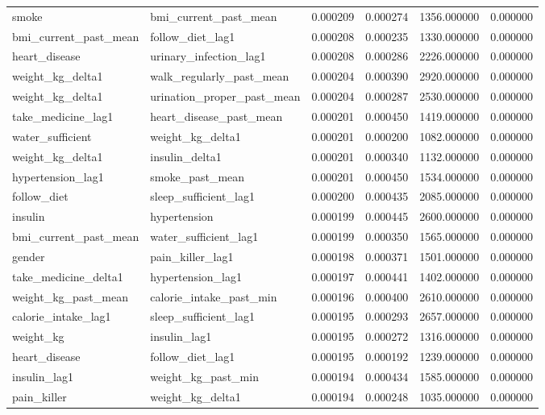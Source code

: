 \begin{longtable}{llrrrr}
smoke & bmi\_current\_past\_mean & 0.000209 & 0.000274 & 1356.000000 & 0.000000 \\
bmi\_current\_past\_mean & follow\_diet\_lag1 & 0.000208 & 0.000235 & 1330.000000 & 0.000000 \\
heart\_disease & urinary\_infection\_lag1 & 0.000208 & 0.000286 & 2226.000000 & 0.000000 \\
weight\_kg\_delta1 & walk\_regularly\_past\_mean & 0.000204 & 0.000390 & 2920.000000 & 0.000000 \\
weight\_kg\_delta1 & urination\_proper\_past\_mean & 0.000204 & 0.000287 & 2530.000000 & 0.000000 \\
take\_medicine\_lag1 & heart\_disease\_past\_mean & 0.000201 & 0.000450 & 1419.000000 & 0.000000 \\
water\_sufficient & weight\_kg\_delta1 & 0.000201 & 0.000200 & 1082.000000 & 0.000000 \\
weight\_kg\_delta1 & insulin\_delta1 & 0.000201 & 0.000340 & 1132.000000 & 0.000000 \\
hypertension\_lag1 & smoke\_past\_mean & 0.000201 & 0.000450 & 1534.000000 & 0.000000 \\
follow\_diet & sleep\_sufficient\_lag1 & 0.000200 & 0.000435 & 2085.000000 & 0.000000 \\
insulin & hypertension & 0.000199 & 0.000445 & 2600.000000 & 0.000000 \\
bmi\_current\_past\_mean & water\_sufficient\_lag1 & 0.000199 & 0.000350 & 1565.000000 & 0.000000 \\
gender & pain\_killer\_lag1 & 0.000198 & 0.000371 & 1501.000000 & 0.000000 \\
take\_medicine\_delta1 & hypertension\_lag1 & 0.000197 & 0.000441 & 1402.000000 & 0.000000 \\
weight\_kg\_past\_mean & calorie\_intake\_past\_min & 0.000196 & 0.000400 & 2610.000000 & 0.000000 \\
calorie\_intake\_lag1 & sleep\_sufficient\_lag1 & 0.000195 & 0.000293 & 2657.000000 & 0.000000 \\
weight\_kg & insulin\_lag1 & 0.000195 & 0.000272 & 1316.000000 & 0.000000 \\
heart\_disease & follow\_diet\_lag1 & 0.000195 & 0.000192 & 1239.000000 & 0.000000 \\
insulin\_lag1 & weight\_kg\_past\_min & 0.000194 & 0.000434 & 1585.000000 & 0.000000 \\
pain\_killer & weight\_kg\_delta1 & 0.000194 & 0.000248 & 1035.000000 & 0.000000 \\

\end{longtable}
